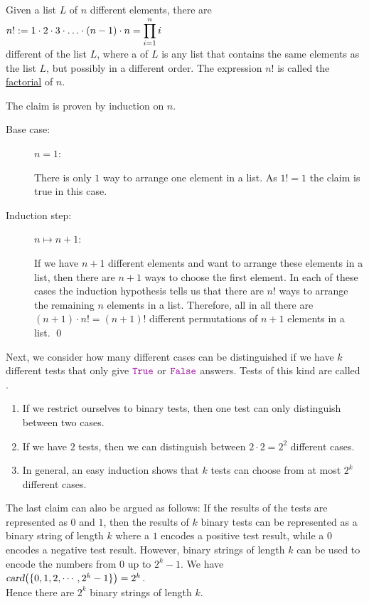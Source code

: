 \begin{Theorem}
Given a list $L$ of $n$ different elements, there are 
\\[0.2cm]
\hspace*{1.3cm}
$\displaystyle n! := 1 \cdot 2 \cdot 3 \cdot {\dots} \cdot (n-1) \cdot n = \prod\limits_{i=1}^n i$ 
\\[0.2cm]
different  of the list $L$, where a   of $L$ is any
list that contains the same elements as the list $L$, but possibly in a different order.
The expression $n!$ is called the
\href{https://en.wikipedia.org/wiki/Factorial}{factorial} of $n$. 
\end{Theorem}
\proof The claim is proven by induction on $n$. 
\begin{description}
\item[Base case:] $n=1$:  

      There is only $1$ way to arrange one element in a list.  As $1! = 1$ the claim is true in this case.
\item[Induction step:] $n \mapsto n+1$:
  
      If we have $n+1$ different elements and want to arrange these elements in a list, then there
      are $n+1$ ways to choose the first element.  In each of these cases the induction
      hypothesis tells us that there are $n!$ ways to arrange the remaining $n$ elements in a list.
      Therefore, all in all there are $(n+1) \cdot n! = (n+1)!$ different permutations of $n+1$
      elements in a list. \qed
\end{description}
Next, we consider how many different cases can be distinguished if we have $k$ different tests
that only give $\mytt{True}$ or $\mytt{False}$ answers.  Tests of this kind are called .
\begin{enumerate}
\item If we restrict ourselves to binary tests, then one test can only distinguish between two cases.
\item If we have $2$ tests, then we can distinguish between  $2 \cdot 2 = 2^2$ different cases.
\item In general, an easy induction shows that $k$ tests can choose from at most $2^k$ different cases.
\end{enumerate}
The last claim can also be argued as follows:  If the results of the tests are represented as
$0$ and $1$, then the results of $k$ binary tests can be represented as a binary string of length
$k$ where a $1$ encodes a positive test result, while a $0$ encodes a negative test result.
However, binary strings of length $k$ can be used to encode the numbers from $0$ up to
$2^{k}-1$.  We have
\\[0.2cm]
\hspace*{1.3cm}
$\textsl{card}\bigl(\{0,1,2,\cdots, 2^k-1\}\bigr) = 2^k$.
\\[0.2cm]
Hence there are $2^k$ binary strings of length $k$.  

